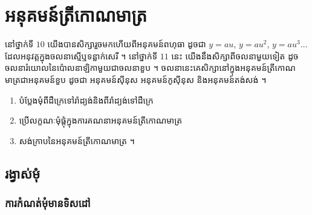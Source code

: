 \chapter{អនុគមន៍ត្រីកោណមាត្រ}

នៅថ្នាក់ទី $10$ យើងបានសិក្សារួចមកហើយពីអនុគមន៍ពហុធា ដូចជា $y = au$, $y = au^2$, $y = au^3 \ldots$ ដែលអនុវត្តក្នុងចលនាស្មើឬទន្លាក់សេរី ។ នៅថ្នាក់ទី $11$ នេះ យើងនឹងសិក្សាពីចលនាមួយទៀត ដូចចលនារំយោលនៃប៉ោលនាឡិកាមួយជាចលនាខួប ។ ចលនានេះគេសិក្សានៅក្នុងអនុគមន៍ត្រីកោណមាត្រជាអនុគមន៍ខួប ដូចជា អនុគមន៍ស៊ីនុស អនុគមន៍កូស៊ីនុស និងអនុគមន៍តង់សង់ ។

\begin{objBox}[វត្ថុបំណង]
\begin{enumerate}[1]
  \item បំប្លែងមុំពីដឺក្រេទៅរ៉ាដ្យង់និងពីរ៉ាដ្យង់ទៅដឺក្រេ
  \item ប្រើលក្ខណៈមុំផ្តុំក្នុងការគណនាអនុគមន៍ត្រីកោណមាត្រ
  \item សង់ក្រាបនៃអនុគមន៍ត្រីកោណមាត្រ ។
\end{enumerate}
\end{objBox}

\section{រង្វាស់មុំ}

\subsection{ការកំណត់មុំមានទិសដៅ}

